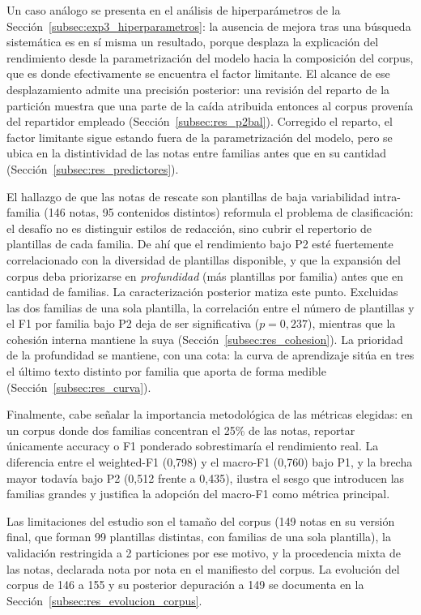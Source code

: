 Un caso análogo se presenta en el análisis de hiperparámetros de la Sección~\ref{subsec:exp3_hiperparametros}: la ausencia de mejora tras una búsqueda sistemática es en sí misma un resultado, porque desplaza la explicación del rendimiento desde la parametrización del modelo hacia la composición del corpus, que es donde efectivamente se encuentra el factor limitante. El alcance de ese desplazamiento admite una precisión posterior: una revisión del reparto de la partición muestra que una parte de la caída atribuida entonces al corpus provenía del repartidor empleado (Sección~\ref{subsec:res_p2bal}). Corregido el reparto, el factor limitante sigue estando fuera de la parametrización del modelo, pero se ubica en la distintividad de las notas entre familias antes que en su cantidad (Sección~\ref{subsec:res_predictores}).

El hallazgo de que las notas de rescate son plantillas de baja variabilidad intra-familia (146 notas, 95 contenidos distintos) reformula el problema de clasificación: el desafío no es distinguir estilos de redacción, sino cubrir el repertorio de plantillas de cada familia. De ahí que el rendimiento bajo P2 esté fuertemente correlacionado con la diversidad de plantillas disponible, y que la expansión del corpus deba priorizarse en \textit{profundidad} (más plantillas por familia) antes que en cantidad de familias. La caracterización posterior matiza este punto. Excluidas las dos familias de una sola plantilla, la correlación entre el número de plantillas y el F1 por familia bajo P2 deja de ser significativa ($p = 0{,}237$), mientras que la cohesión interna mantiene la suya (Sección~\ref{subsec:res_cohesion}). La prioridad de la profundidad se mantiene, con una cota: la curva de aprendizaje sitúa en tres el último texto distinto por familia que aporta de forma medible (Sección~\ref{subsec:res_curva}).

Finalmente, cabe señalar la importancia metodológica de las métricas elegidas: en un corpus donde dos familias concentran el 25\% de las notas, reportar únicamente accuracy o F1 ponderado sobrestimaría el rendimiento real. La diferencia entre el weighted-F1 (0,798) y el macro-F1 (0,760) bajo P1, y la brecha mayor todavía bajo P2 (0,512 frente a 0,435), ilustra el sesgo que introducen las familias grandes y justifica la adopción del macro-F1 como métrica principal.

Las limitaciones del estudio son el tamaño del corpus (149 notas en su versión final, que forman 99 plantillas distintas, con familias de una sola plantilla), la validación restringida a 2 particiones por ese motivo, y la procedencia mixta de las notas, declarada nota por nota en el manifiesto del corpus. La evolución del corpus de 146 a 155 y su posterior depuración a 149 se documenta en la Sección~\ref{subsec:res_evolucion_corpus}.
